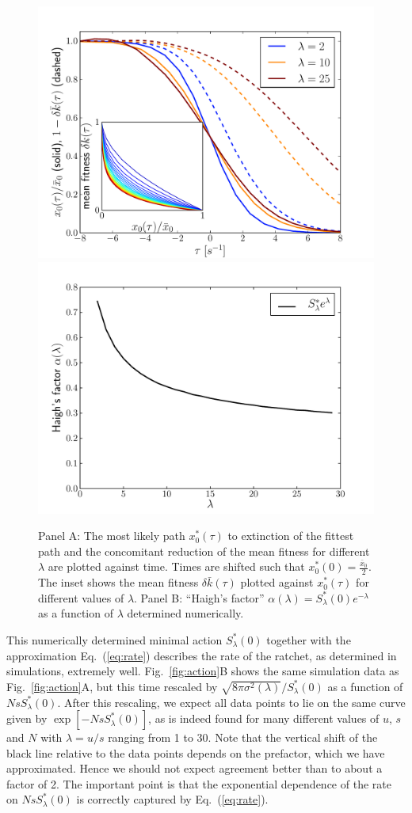 \documentclass[rmp,preprint]{revtex4}
\newcommand{\EQ}[1]{Eq.~(\ref{eq:#1})}
\newcommand{\FIG}[1]{Fig.~\ref{fig:#1}}
\newcommand{\x}{x}
\newcommand{\xs}{\bar{\x}}
\newcommand{\dk}{\delta \bar{k}}
\newcommand{\Smin}{S^*}
\newcommand{\mut}{u}
\begin{document}
\begin{figure}[tb]
\begin{center}
  \includegraphics[width=0.48\columnwidth]{Figures/n0_and_dk_trajectories}
  \includegraphics[width=0.48\columnwidth]{Figures/approx_Smin}
  \caption[labelInTOC]{Panel A: The most likely path $\x^*_0(\tau)$ to extinction of the fittest path and the concomitant reduction of the mean fitness for different $\lambda$ are plotted against time. Times are shifted such that $\x^*_0(0) = \frac{\xs_0}{2}$. The inset shows the mean fitness $\dk(\tau)$ plotted against $\x^*_0(\tau)$ for different values of $\lambda$. Panel B: ``Haigh's factor'' $\alpha(\lambda) = \Smin_\lambda(0)e^{-\lambda}$ as a function of $\lambda$ determined numerically.}
\label{fig:trajectories}
\end{center}
\end{figure}

This numerically determined minimal action $\Smin_{\lambda}(0)$ together with the approximation \EQ{rate} describes the rate of the ratchet, as determined in simulations, extremely well. \FIG{action}B shows the same simulation data as \FIG{action}A, but this time rescaled by $\sqrt{8\pi \sigma^2(\lambda)}/\Smin_{\lambda}(0)$ as a function of $Ns\Smin_{\lambda}(0)$. After this rescaling, we expect all data points to lie on the same curve given by $\exp[-Ns\Smin_{\lambda}(0)]$, as is indeed found for many different values of $\mut$, $s$ and $N$ with $\lambda = \mut/s$ ranging from 1 to 30. Note that the vertical shift of the black line relative to the data points depends on the prefactor, which we have approximated. Hence we should not expect agreement better than to about a factor of 2. The important point is that the exponential dependence of the rate on $Ns \Smin_{\lambda}(0)$ is correctly captured by \EQ{rate}.
\end{document}
